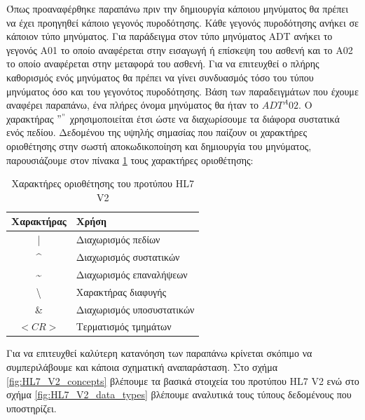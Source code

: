 	Όπως προαναφέρθηκε παραπάνω πριν την δημιουργία κάποιου μηνύματος θα πρέπει να έχει προηγηθεί κάποιο γεγονός πυροδότησης. Κάθε γεγονός πυροδότησης ανήκει σε κάποιον τύπο μηνύματος. Για παράδειγμα στον τύπο μηνύματος ADT ανήκει το γεγονός A01 το οποίο αναφέρεται στην εισαγωγή ή επίσκεψη του ασθενή και το Α02 το οποίο αναφέρεται στην μεταφορά του ασθενή. Για να επιτευχθεί ο πλήρης καθορισμός ενός μηνύματος θα πρέπει να γίνει συνδυασμός τόσο του τύπου μηνύματος όσο και του γεγονότος πυροδότησης. Βάση των παραδειγμάτων που έχουμε αναφέρει παραπάνω, ένα πλήρες όνομα μηνύματος θα ήταν το $ADT^A02$. Ο χαρακτήρας $"^"$ χρησιμοποιείται έτσι ώστε να διαχωρίσουμε τα διάφορα συστατικά ενός πεδίου. Δεδομένου της υψηλής σημασίας που παίζουν οι χαρακτήρες οριοθέτησης στην σωστή αποκωδικοποίηση και δημιουργία του μηνύματος, παρουσιάζουμε στον πίνακα \ref{tab:HL7_delimeters} τους χαρακτήρες οριοθέτησης:
	\begin{table}[H]
		\begin{center}
		    \begin{tabular}{|c|l|}
		    \hline
		    \rowcolor{grayy}
		    \textbf{Χαρακτήρας} & \textbf{Χρήση}
		    \\ \hline
		     | & Διαχωρισμός πεδίων
		     \\ \hline
		     \^{} & Διαχωρισμός συστατικών
		     \\ \hline
		     \~{} & Διαχωρισμός επαναλήψεων
		     \\ \hline
		     \textbackslash & Χαρακτήρας διαφυγής
		     \\ \hline
		     \& & Διαχωρισμός υποσυστατικών
		     \\ \hline
		     $<CR>$ & Τερματισμός τμημάτων
		     \\ \hline
		    \end{tabular}
		    \caption{Χαρακτήρες οριοθέτησης του προτύπου HL7 V2}
			\label{tab:HL7_delimeters}
		\end{center}
	\end{table}
	
	Για να επιτευχθεί καλύτερη κατανόηση των παραπάνω κρίνεται σκόπιμο να συμπεριλάβουμε και κάποια σχηματική αναπαράσταση. Στο σχήμα \ref{fig:HL7_V2_concepts} βλέπουμε τα βασικά στοιχεία του προτύπου HL7 V2 ενώ στο σχήμα \ref{fig:HL7_V2_data_types} βλέπουμε αναλυτικά τους τύπους δεδομένους που υποστηρίζει.
	
